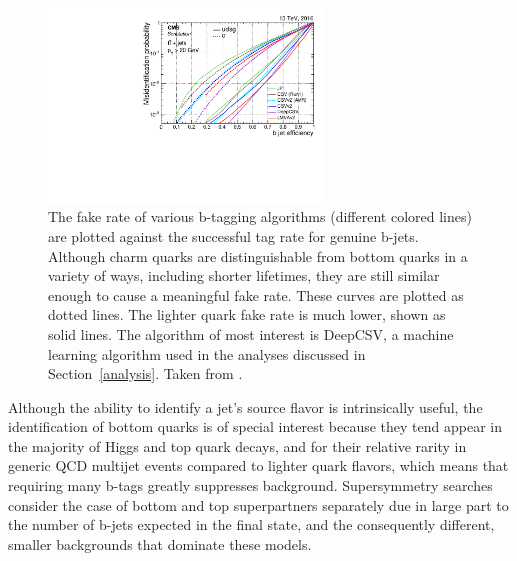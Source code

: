   \begin{figure}[h!]
    \centering
    \includegraphics[width=0.65\textwidth]{figures/btageff.pdf}
    \caption[Efficiency and fake-rates of various b-tagging algorithms.]{
      The fake rate of various b-tagging algorithms (different colored lines) are plotted against the successful tag rate for genuine b-jets.
      Although charm quarks are distinguishable from bottom quarks in a variety of ways, including shorter lifetimes, they are still similar enough to cause a meaningful fake rate.
      These curves are plotted as dotted lines.
      The lighter quark fake rate is much lower, shown as solid lines.
      The algorithm of most interest is DeepCSV, a machine learning algorithm used in the analyses discussed in Section~\ref{analysis}.
      Taken from \cite{btagging}.}
    \label{fig:btageff}
  \end{figure}  

  Although the ability to identify a jet's source flavor is intrinsically useful, the identification of bottom quarks is of special interest because they tend appear in the majority of Higgs and top quark decays, and for their relative rarity in generic QCD multijet events compared to lighter quark flavors, which means that requiring many b-tags greatly suppresses background.
  Supersymmetry searches consider the case of bottom and top superpartners separately due in large part to the number of b-jets expected in the final state, and the consequently different, smaller backgrounds that dominate these models.


